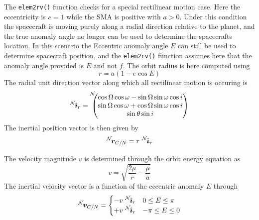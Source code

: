 The {\tt elem2rv()} function checks for a special rectilinear motion case.  Here the eccentricity is $e = 1$ while the SMA is positive with $a>0$.  Under this condition the spacecraft is moving purely along a radial direction relative to the planet, and the true anomaly angle no longer can be used to determine the spacecrafts location.  In this scenario the Eccentric anomaly angle $E$ can still be used to determine spacecraft position, and the {\tt elem2rv()} function assumes here that the anomaly angle provided is $E$ and not $f$.  The orbit radius is here computed using\cite{schaub}
\begin{equation}
	r = a (1 - e \cos E)
\end{equation}
The radial unit direction vector along which all rectilinear motion is occuring is
\begin{equation}
	\leftexp{N}{\hat{\bm\imath}}_{r}=\leftexp{N\!\!\!}{\begin{pmatrix}
\cos\Omega\cos\omega 
- \sin\Omega\sin\omega\cos i \\ 
\sin\Omega\cos\omega + \cos\Omega\sin\omega\cos 
i \\
 \sin\theta\sin i 
 \end{pmatrix}}
\end{equation}
The inertial position vector is then given by
\begin{equation}
\leftexp{N}{\bm r}_{C/N} =r \ \leftexp{N}{\hat{\bm\imath}}_{r}
\end{equation}


The velocity magnitude $v$ is determined through the orbit energy equation as\cite{schaub}
\begin{equation}
	v = \sqrt{ \frac{2 \mu}{r} - \frac{\mu}{a} }
\end{equation}
The inertial velocity vector is a function of the eccentric anomaly $E$ through
\begin{equation}
	\leftexp{N}{\bm v}_{C/N} = \begin{cases}
		-v \ \leftexp{N}{\hat{\bm\imath}}_{r}  & 0 \le E \le \pi \\
		+v  \ \leftexp{N}{\hat{\bm\imath}}_{r} & -\pi \le E \le 0
	\end{cases}
\end{equation}





